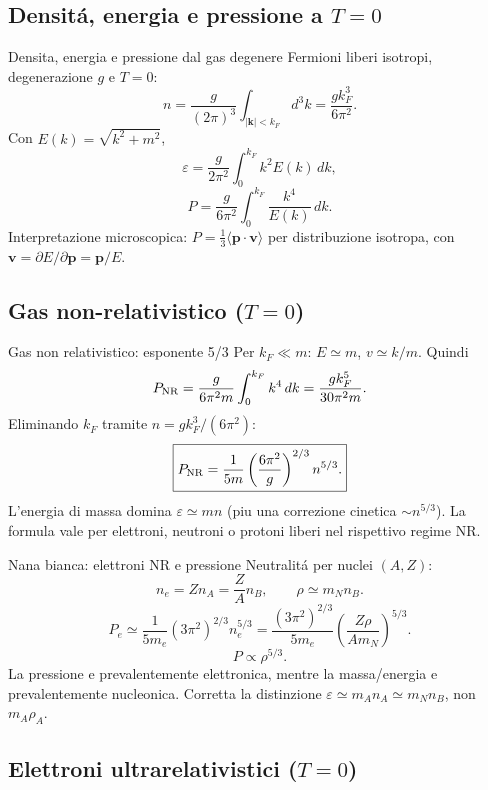 \subsection{Densit\'a, energia e pressione a $T=0$}

\begin{frame}[t]{Densita, energia e pressione dal gas degenere}
\vspace*{3mm}
\small
Fermioni liberi isotropi, degenerazione $g$ e $T=0$:
\[
n=\frac{g}{(2\pi)^3}\int_{|\mathbf k|<k_F}d^3k=\frac{gk_F^3}{6\pi^2}.
\]
Con $E(k)=\sqrt{k^2+m^2}$,
\[
\varepsilon=\frac{g}{2\pi^2}\int_0^{k_F}k^2 E(k)\,dk,
\]
\[
\boxed{P=\frac{g}{6\pi^2}\int_0^{k_F}\frac{k^4}{E(k)}\,dk.}
\]
Interpretazione microscopica: $P=\frac13\langle\mathbf p\cdot\mathbf v\rangle$ per distribuzione isotropa, con $\mathbf v=\partial E/\partial\mathbf p=\mathbf p/E$.
\end{frame}

\subsection{Gas non-relativistico ($T=0$)}

\begin{frame}[t]{Gas non relativistico: esponente 5/3}
\vspace*{3mm}
\small
Per $k_F\ll m$: $E\simeq m$, $v\simeq k/m$. Quindi
\[
P_{\rm NR}=\frac{g}{6\pi^2m}\int_0^{k_F}k^4\,dk
=\frac{gk_F^5}{30\pi^2m}.
\]
Eliminando $k_F$ tramite $n=gk_F^3/(6\pi^2)$:
\[
\boxed{P_{\rm NR}=\frac1{5m}\left(\frac{6\pi^2}{g}\right)^{2/3}n^{5/3}.}
\]
L'energia di massa domina $\varepsilon\simeq mn$ (piu una correzione cinetica $\sim n^{5/3}$). La formula vale per elettroni, neutroni o protoni liberi nel rispettivo regime NR.
\end{frame}

\begin{frame}[t]{Nana bianca: elettroni NR e pressione}
\vspace*{3mm}
\small
Neutralit\'a per nuclei $(A,Z)$:
\[
n_e=Zn_A=\frac ZA n_B,\qquad \rho\simeq m_Nn_B.
\]
\[
P_e\simeq\frac1{5m_e}(3\pi^2)^{2/3}n_e^{5/3}
=\frac{(3\pi^2)^{2/3}}{5m_e}
\left(\frac{Z\rho}{Am_N}\right)^{5/3}.
\]
\[
\boxed{P\propto\rho^{5/3}.}
\]
La pressione e prevalentemente elettronica, mentre la massa/energia e prevalentemente nucleonica. Corretta la distinzione $\varepsilon\simeq m_A n_A\simeq m_N n_B$, non $m_A\rho_A$.
\end{frame}

\subsection{Elettroni ultrarelativistici ($T=0$)}

